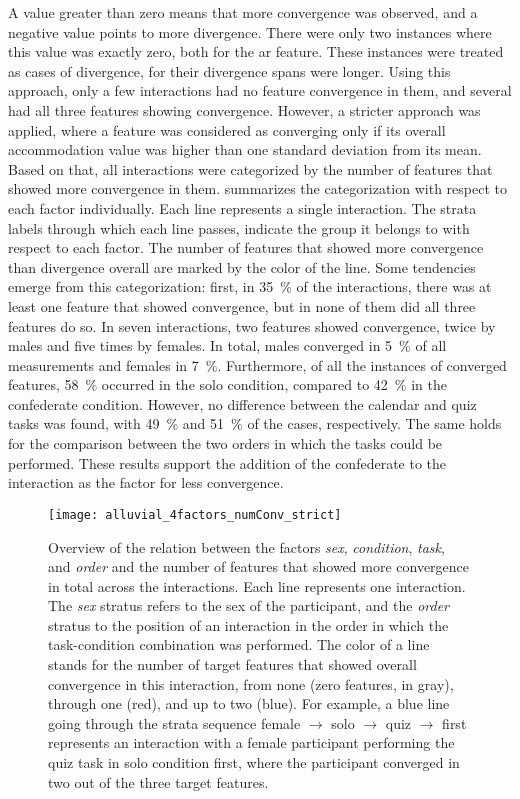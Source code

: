 A value greater than zero means that more convergence was observed, and a negative value points to more divergence.
There were only two instances where this value was exactly zero, both for the \ac{ar} feature.
These instances were treated as cases of divergence, for their divergence spans were longer.
Using this approach, only a few interactions had no feature convergence in them, and several had all three features showing convergence.
However, a stricter approach was applied, where a feature was considered as converging only if its overall accommodation value was higher than one standard deviation from its mean.
Based on that, all interactions were categorized by the number of features that showed more convergence in them.
 summarizes the categorization with respect to each factor individually.
Each line represents a single interaction.
The strata labels through which each line passes, indicate the group it belongs to with respect to each factor.
The number of features that showed more convergence than divergence overall are marked by the color of the line.
Some tendencies emerge from this categorization:
first, in \SI{35}{\percent} of the interactions, there was at least one feature that showed convergence, but in none of them did all three features do so.
In seven interactions, two features showed convergence, twice by males and five times by females.
In total, males converged in \SI{5}{\percent} of all measurements and females in \SI{7}{\percent}.
Furthermore, of all the instances of converged features, \SI{58}{\percent} occurred in the solo condition, compared to \SI{42}{\percent} in the confederate condition.
However, no difference between the calendar and quiz tasks was found, with \SI{49}{\percent} and \SI{51}{\percent} of the cases, respectively.
The same holds for the comparison between the two orders in which the tasks could be performed.
These results support the addition of the confederate to the interaction as the factor for less convergence.
%
\begin{figure}[t]
	\centering
	\texttt{[image: alluvial\_4factors\_numConv\_strict]}
	\caption[Number of significantly different behaviors per factor]
		{Overview of the relation between the factors \emph{sex}, \emph{condition}, \emph{task}, and \emph{order} and the number of features that showed more convergence in total across the interactions.
		Each line represents one interaction.
		The \emph{sex} stratus refers to the sex of the participant, and the \emph{order} stratus to the position of an interaction in the order in which the task-condition combination was performed.
		The color of a line stands for the number of target features that showed overall convergence in this interaction, from none (zero features, in gray), through one (red), and up to two (blue).
		For example, a blue line going through the strata sequence female $\rightarrow$ solo $\rightarrow$ quiz $\rightarrow$ first represents an interaction with a female participant performing the quiz task in solo condition first, where the participant converged in two out of the three target features.}
	\label{fig:alluvial}
\end{figure}
%

